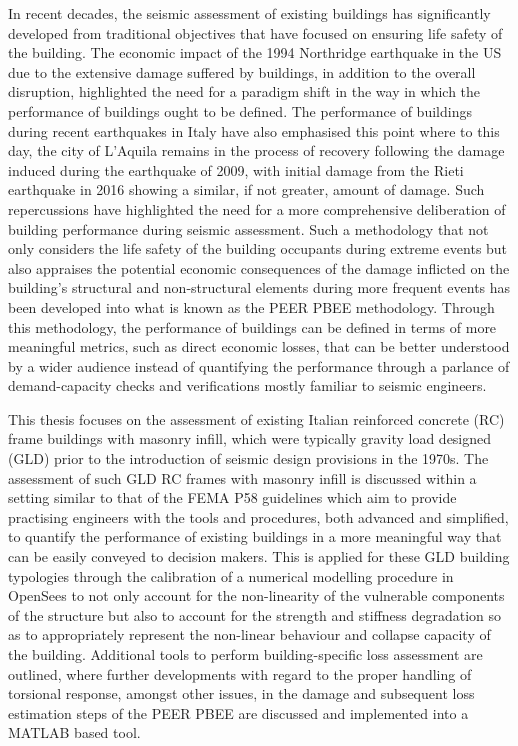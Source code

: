 In recent decades, the seismic assessment of existing buildings has significantly developed from traditional objectives that have focused on ensuring life safety of the building. The economic impact of the 1994 Northridge earthquake in the US due to the extensive damage suffered by buildings, in addition to the overall disruption, highlighted the need for a paradigm shift in the way in which the performance of buildings ought to be defined. The performance of buildings during recent earthquakes in Italy have also emphasised this point where to this day, the city of L’Aquila remains in the process of recovery following the damage induced during the earthquake of 2009, with initial damage from the Rieti earthquake in 2016 showing a similar, if not greater, amount of damage. Such repercussions have highlighted the need for a more comprehensive deliberation of building performance during seismic assessment. Such a methodology that not only considers the life safety of the building occupants during extreme events but also appraises the potential economic consequences of the damage inflicted on the building’s structural and non-structural elements during more frequent events has been developed into what is known as the PEER PBEE methodology. Through this methodology, the performance of buildings can be defined in terms of more meaningful metrics, such as direct economic losses, that can be better understood by a wider audience instead of quantifying the performance through a parlance of demand-capacity checks and verifications mostly familiar to seismic engineers.

This thesis focuses on the assessment of existing Italian reinforced concrete (RC) frame buildings with masonry infill, which were typically gravity load designed (GLD) prior to the introduction of seismic design provisions in the 1970s. The assessment of such GLD RC frames with masonry infill is discussed within a setting similar to that of the FEMA P58 guidelines which aim to provide practising engineers with the tools and procedures, both advanced and simplified, to quantify the performance of existing buildings in a more meaningful way that can be easily conveyed to decision makers. This is applied for these GLD building typologies through the calibration of a numerical modelling procedure in OpenSees to not only account for the non-linearity of the vulnerable components of the structure but also to account for the strength and stiffness degradation so as to appropriately represent the non-linear behaviour and collapse capacity of the building. Additional tools to perform building-specific loss assessment are outlined, where further developments with regard to the proper handling of torsional response, amongst other issues, in the damage and subsequent loss estimation steps of the PEER PBEE are discussed and implemented into a MATLAB based tool. 

